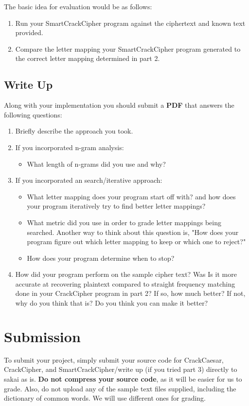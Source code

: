 \documentclass{article}
\begin{document}
\noindent The basic idea for evaluation would be as follows:
\begin{enumerate}
\item Run your SmartCrackCipher program against the ciphertext and known text provided.
\item Compare the letter mapping your SmartCrackCipher program generated to the correct letter mapping determined in part 2.
\end{enumerate}

\subsection{Write Up}
Along with your implementation you should submit a \textbf{PDF} that answers the following questions:
\begin{enumerate}
\item Briefly describe the approach you took. 
\item If you incorporated n-gram analysis:
\begin{itemize}
\item What length of n-grams did you use and why?
\end{itemize}
\item If you incorporated an search/iterative approach:
\begin{itemize}
\item What letter mapping does your program start off with? and how does your program iteratively try to find better letter mappings?
\item What metric did you use in order to grade letter mappings being searched. Another way to think about this question is, "How does your program figure out which letter mapping to keep or which one to reject?"
\item How does your program determine when to stop?
\end{itemize}
\item How did your program perform on the sample cipher text? Was Is it more accurate at recovering plaintext compared to straight frequency matching done in your CrackCipher program in part 2? If so, how much better? If not, why do you think that is? Do you think you can make it better?
\end{enumerate}


\section{Submission}
To submit your project, simply submit your source code for CrackCaesar, CrackCipher, and SmartCrackCipher/write up (if you tried part 3) directly to sakai as is. \textbf{Do not compress your source code}, as it will be easier for us to grade. Also, do not upload any of the sample text files supplied, including the dictionary of common words. We will use different ones for grading.
\end{document}
